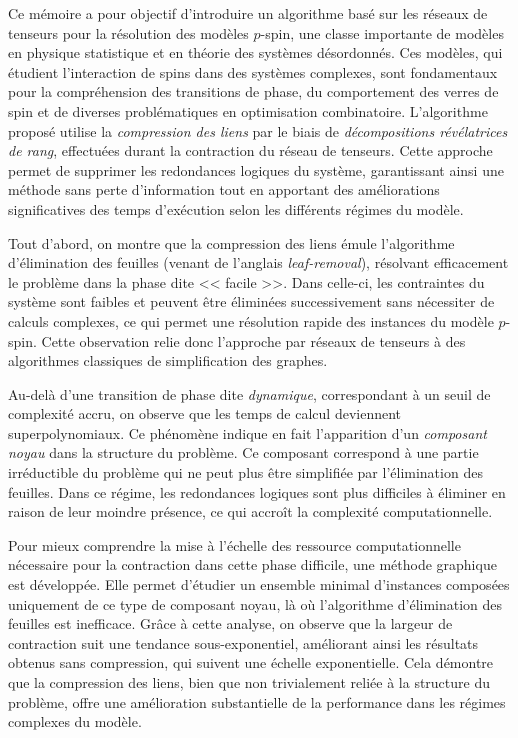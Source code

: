 \begin{comment}
\end{comment}

Ce mémoire a pour objectif d'introduire un algorithme basé sur les réseaux de tenseurs pour la résolution des modèles $p$-spin, une classe importante de modèles en physique statistique et en théorie des systèmes désordonnés.
Ces modèles, qui étudient l'interaction de spins dans des systèmes complexes, sont fondamentaux pour la compréhension des transitions de phase, du comportement des verres de spin et de diverses problématiques en optimisation combinatoire.
L'algorithme proposé utilise la \emph{compression des liens} par le biais de \emph{décompositions révélatrices de rang}, effectuées durant la contraction du réseau de tenseurs.
Cette approche permet de supprimer les redondances logiques du système, garantissant ainsi une méthode sans perte d'information tout en apportant des améliorations significatives des temps d'exécution selon les différents régimes du modèle.

Tout d'abord, on montre que la compression des liens émule l'algorithme d'élimination des feuilles (venant de l'anglais \textit{leaf-removal}), résolvant efficacement le problème dans la phase dite << facile >>.
Dans celle-ci, les contraintes du système sont faibles et peuvent être éliminées successivement sans nécessiter de calculs complexes, ce qui permet une résolution rapide des instances du modèle $p$-spin.
Cette observation relie donc l'approche par réseaux de tenseurs à des algorithmes classiques de simplification des graphes.

Au-delà d'une transition de phase dite \emph{dynamique}, correspondant à un seuil de complexité accru, on observe que les temps de calcul deviennent superpolynomiaux.
Ce phénomène indique en fait l'apparition d'un \emph{composant noyau} dans la structure du problème.
Ce composant correspond à une partie irréductible du problème qui ne peut plus être simplifiée par l'élimination des feuilles.
Dans ce régime, les redondances logiques sont plus difficiles à éliminer en raison de leur moindre présence, ce qui accroît la complexité computationnelle.

Pour mieux comprendre la mise à l'échelle des ressource computationnelle nécessaire pour la contraction dans cette phase difficile, une méthode graphique est développée.
Elle permet d'étudier un ensemble minimal d'instances composées uniquement de ce type de composant noyau, là où l'algorithme d'élimination des feuilles est inefficace.
Grâce à cette analyse, on observe que la largeur de contraction suit une tendance sous-exponentiel, améliorant ainsi les résultats obtenus sans compression, qui suivent une échelle exponentielle.
Cela démontre que la compression des liens, bien que non trivialement reliée à la structure du problème, offre une amélioration substantielle de la performance dans les régimes complexes du modèle.

